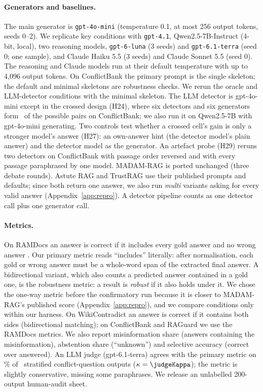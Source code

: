 \paragraph{Generators and baselines.}
The main generator is \texttt{gpt-4o-mini} \citep{openai2024gpt4o} (temperature 0.1, at most 256 output tokens, seeds
0--2). We replicate key conditions with \texttt{gpt-4.1}, Qwen2.5-7B-Instruct \citep{yang2024qwen25} (4-bit, local),
two reasoning models, \texttt{gpt-6-luna} (3 seeds) and \texttt{gpt-6.1-terra} (seed 0; one sample), and
Claude Haiku 5.5 (3 seeds) and Claude Sonnet 5.5 (seed 0). The reasoning and Claude models run at their default
temperature with up to 4,096 output tokens. On ConflictBank the primary prompt is
the single skeleton; the default and minimal skeletons are robustness checks. We rerun the oracle and LLM-detector
conditions with the minimal skeleton.
The LLM detector is gpt-4o-mini except in the crossed design (H24), where six detectors and six generators form
\hTwentyFourCells\ of the possible pairs on ConflictBank; we also run it on Qwen2.5-7B with gpt-4o-mini generating. Two controls test
whether a crossed cell's gain is only a stronger model's answer (H27): an own-answer hint (the detector model's plain
answer) and the detector model as the generator. An artefact probe (H29) reruns two detectors on
ConflictBank with passage order reversed and with every passage paraphrased by one model.
MADAM-RAG \citep{wang2025madam} is ported unchanged (three debate rounds). Astute RAG \citep{wang2025astute} and
TrustRAG \citep{zhou2025trustrag} use their published prompts and defaults; since both return one answer, we also run
\emph{multi} variants asking for every valid answer (Appendix~\ref{app:repro}). A detector pipeline counts as one
detector call plus one generator call.

\paragraph{Metrics.}
On RAMDocs an answer is correct if it includes every gold answer and no wrong answer \citep{wang2025madam}. Our primary
metric reads ``includes'' literally: after normalisation, each gold or wrong answer must be a whole-word span
of the extracted final answer. A bidirectional variant, which also counts a predicted answer contained in a gold one,
is the robustness metric: a result is \emph{robust} if it also holds under it. We chose the one-way metric before the confirmatory run because it is closer to MADAM-RAG's
published score (Appendix~\ref{app:repro}), and we compare conditions only within our harness. On WikiContradict
an answer is correct if it contains both sides (bidirectional matching); on ConflictBank and RAGuard we use the RAMDocs metrics. We also report
misinformation share (answers containing the misinformation), abstention share (``unknown'') and selective accuracy
(correct over answered). An LLM judge (gpt-6.1-terra) agrees with the primary metric on \judgeAgree\% of \judgeN\ stratified
conflict-question outputs ($\kappa=\judgeKappa$); the metric is slightly conservative, missing some paraphrases. We
release an unlabelled 200-output human-audit sheet.

